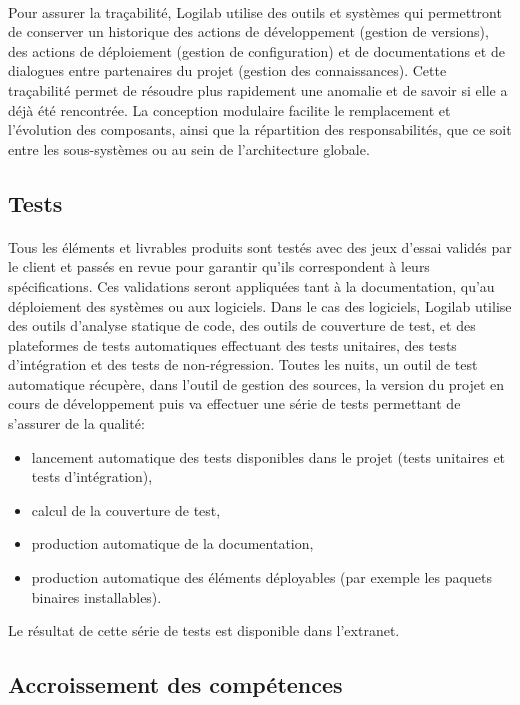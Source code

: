 \documentclass {report}
\begin{document}
\paragraph{}
Pour assurer la traçabilité, Logilab utilise des outils et systèmes  qui permettront de conserver un historique des actions de développement (gestion de versions),  des actions de déploiement (gestion de configuration) et de documentations et de dialogues entre partenaires du projet (gestion des connaissances). Cette traçabilité permet de résoudre plus rapidement une anomalie et de savoir si elle a déjà été rencontrée. La conception modulaire facilite le remplacement et l’évolution des composants, ainsi que la répartition des responsabilités, que ce soit entre les sous-systèmes ou au sein de l’architecture globale. 
\subsection{Tests}
\paragraph{}
Tous les éléments et livrables produits sont testés avec des jeux d’essai validés par le client et passés en revue pour garantir qu’ils correspondent à leurs spécifications. Ces validations seront appliquées tant à la documentation, qu’au déploiement des systèmes ou aux logiciels. Dans le cas des logiciels, Logilab utilise des outils d’analyse statique de code, des outils de couverture de test, et des plateformes de tests automatiques effectuant des tests unitaires, des tests d’intégration et des tests de non-régression. Toutes les nuits, un outil de test automatique récupère, dans l’outil de gestion des sources, la version du projet en cours de développement puis va effectuer une série de tests permettant de s’assurer de la qualité: 
\begin{itemize}
\item lancement automatique des tests disponibles dans le projet (tests unitaires et tests d’intégration),
\item calcul de la couverture de test,
\item production automatique de la documentation,
\item production automatique des éléments déployables (par exemple les paquets binaires installables). 
\end{itemize}
    Le résultat de cette série de tests est disponible dans l’extranet.
\subsection{Accroissement des compétences}
\end{document}
